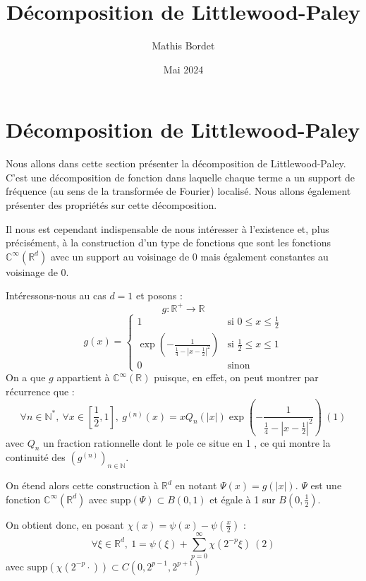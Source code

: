 \documentclass{article}
\title{Décomposition de Littlewood-Paley}
\author{Mathis Bordet}
\date{Mai 2024}
\begin{document}
\maketitle 

\section{Décomposition de Littlewood-Paley}
Nous allons dans cette section présenter la décomposition de Littlewood-Paley. C'est une décomposition de fonction dans laquelle chaque terme a un support de fréquence (au sens de la transformée de Fourier) localisé. Nous allons également présenter des propriétés sur cette décomposition.

Il nous est cependant indispensable de nous intéresser à l'existence et, plus précisément, à la construction d'un type de fonctions que sont les fonctions $\mathbb{C}^\infty(\mathbb{R}^d)$ avec un support au voisinage de 0 mais également constantes au voisinage de 0.

Intéressons-nous au cas $d=1$ et posons :
\[
g: \mathbb{R}^+ \to \mathbb{R}
\]
\[
g(x) = 
\begin{cases} 
1 & \text{si } 0 \leq x \leq \frac{1}{2} \\
\exp\left(-\frac{1}{\frac{1}{4} - |x - \frac{1}{2}|^2}\right) & \text{si } \frac{1}{2} \leq x \leq 1 \\
0 & \text{sinon}
\end{cases}
\]
On a que $g$ appartient à $\mathbb{C}^\infty(\mathbb{R})$ puisque, en effet, on peut montrer par récurrence que :
\[
\forall n \in \mathbb{N}^*, \ \forall x \in \left[\frac{1}{2}, 1\right], \ g^{(n)}(x) = x Q_n(|x|) \exp\left(-\frac{1}{\frac{1}{4} - |x - \frac{1}{2}|^2}\right) \: (1)
\]
avec $Q_n$ un fraction rationnelle dont le pole ce situe en 1 , ce qui montre la continuité des $(g^{(n)})_{n \in \mathbb{N}}$.

On étend alors cette construction à $\mathbb{R}^d$ en notant $\Psi(x)=g(|x|)$. $\Psi$ est une fonction $\mathbb{C}^\infty(\mathbb{R}^d)$ avec $\text{supp}(\Psi) \subset B(0,1)$ et égale à 1 sur $B(0,\frac{1}{2})$.

On obtient donc, en posant $\chi(x)=\psi(x)-\psi\left(\frac{x}{2}\right)$ :
\[
\forall \xi \in \mathbb{R}^d, \ 1= \psi(\xi) + \sum_{p=0}^\infty \chi(2^{-p} \xi) \: (2)
\]
avec $\text{supp}(\chi(2^{-p} \cdot)) \subset C(0,2^{p-1},2^{p+1})$
\end{document}
